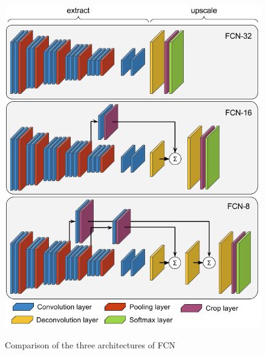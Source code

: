 \begin{appendices}

\begin{figure}[!h]
  \includegraphics[width=1\linewidth,center]{images/appendices/fcns_architecture.png}
  \caption{Comparison of the three architectures of FCN}\textbf{
  \label{fig:appendices:fcns_architecture}}
\end{figure}


\end{appendices}
